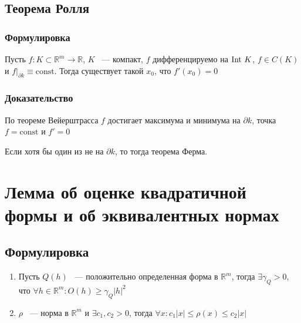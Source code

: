 \documentclass{article}
\begin{document}
        \subsection{Теорема Ролля}
        
            \subsubsection{Формулировка}
            
                Пусть $f : K \subset \mathbb{R}^m \rightarrow \mathbb{R}$, $K$ ~--- компакт, $f$ дифференцируемо на $\Int K$, $f \in C(K)$ и $f \bigg|_{\partial k} \equiv \mathrm{const}$. Тогда существует такой $x_0$, что $f'(x_0) = 0$
                
            \subsubsection{Доказательство}
            
                По теореме Вейерштрасса $f$ достигает максимума и минимума на $\partial k$, точка $f = \mathrm{const}$ и $f' = 0$
                
                Если хотя бы один из не на $\partial k$, то тогда теорема Ферма.
            
    \newpage
    
    \section{Лемма об оценке квадратичной формы и об эквивалентных нормах}
    
        \subsection{Формулировка}
            
            \begin{enumerate}
            
                \item Пусть $Q(h)$ ~--- положительно определенная форма в $\mathbb{R}^m$, тогда $\exists \gamma_Q > 0$, что $\forall h \in \mathbb{R}^m : O(h) \geq \gamma_Q |h|^2$
                
                \item $\rho$ ~--- норма в $\mathbb{R}^m$ и $\exists c_1, c_2 > 0$, тогда $\forall x : c_1 |x| \leq \rho(x) \leq c_2 |x|$
                
            \end{enumerate}
            
\end{document}

